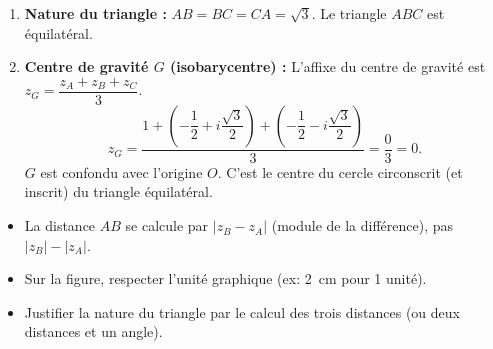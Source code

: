 \documentclass[11pt]{article}
\newcommand{\cle}[1]{{\popxbold\color{popdark}#1}}
\begin{document}
\begin{corrige}
\begin{enumerate}
\item \textbf{Nature du triangle :} $AB = BC = CA = \sqrt{3}$. Le triangle $ABC$ est \cle{équilatéral}.

\item \textbf{Centre de gravité $G$ (isobarycentre) :}
L'affixe du centre de gravité est $z_G = \dfrac{z_A + z_B + z_C}{3}$.
\[ z_G = \dfrac{1 + \left(-\dfrac{1}{2} + i\dfrac{\sqrt{3}}{2}\right) + \left(-\dfrac{1}{2} - i\dfrac{\sqrt{3}}{2}\right)}{3} = \dfrac{0}{3} = 0. \]
$G$ est confondu avec l'origine $O$. C'est le centre du cercle circonscrit (et inscrit) du triangle équilatéral.
\end{enumerate}

\begin{attention}
\begin{itemize}
\item La distance $AB$ se calcule par $|z_B - z_A|$ (module de la différence), pas $|z_B| - |z_A|$.
\item Sur la figure, respecter l'unité graphique (ex: \SI{2}{cm} pour 1 unité).
\item Justifier la nature du triangle par le calcul des trois distances (ou deux distances et un angle).
\end{itemize}
\end{attention}
\end{corrige}
\end{document}
